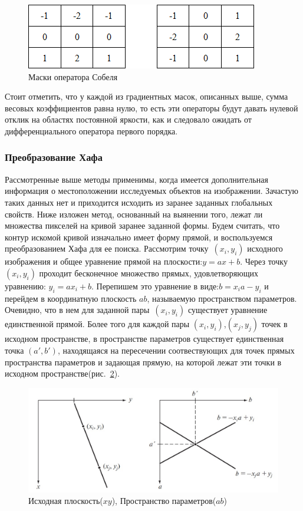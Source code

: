 \documentclass[12pt,a4paper]{article} %
\begin{document}
\begin{figure}[h]
	
	\centering
	
	\includegraphics[width=0.4\linewidth]{grad_mask_sob.jpg}
	
	\caption{Маски оператора Собеля}
	
	\label{fig:grad_mask_sob}
	
\end{figure}

Стоит отметить, что у каждой из градиентных масок, описанных выше, сумма весовых коэффициентов равна нулю, то есть эти операторы будут давать нулевой отклик на областях постоянной яркости, как и следовало ожидать от дифференциального оператора первого порядка.

\subsubsection{Преобразование Хафа}

Рассмотренные выше методы применимы, когда имеется дополнительная информация о местоположении исследуемых объектов на изображении. Зачастую таких данных нет и приходится исходить из заранее заданных глобальных свойств. Ниже изложен метод, основанный на выянении того, лежат ли множества пикселей на кривой заранее заданной формы.
Будем считать, что контур искомой кривой изначально имеет форму прямой, и воспользуемся преобразованием Хафа для ее поиска.
Рассмотрим точку~$(x_i, y_i)$ исходного изображения и общее уравнение прямой на плоскости:$y = ax+b$. Через точку~$(x_i, y_i)$ проходит бесконечное множество прямых, удовлетворяющих уравнению: $y_i = ax_i+b$. Перепишем это уравнение в виде:$b = x_i a - y_i$ и перейдем в координатную плоскость $ab$, называемую пространством параметров. Очевидно, что в нем для заданной пары~$(x_i, y_i)$ существует уравнение единственной прямой. Более того для каждой пары $(x_i, y_i)$,$(x_j, y_j)$ точек в исходном пространстве, в пространстве параметров существует единственная точка $(a', b')$, находящаяся на пересечении соотвествующих для точек прямых пространства параметров и задающая прямую, на которой лежат эти точки в исходном пространстве(рис.~\ref{fig:param_haf}).

\begin{figure}[h]
	
	\centering
	
	\includegraphics[width=0.6\linewidth]{param_haf.jpg}
	
	\caption{Исходная плоскость($xy$), Пространство параметров($ab$)}
	
	\label{fig:param_haf}
	
\end{figure}
\end{document}

